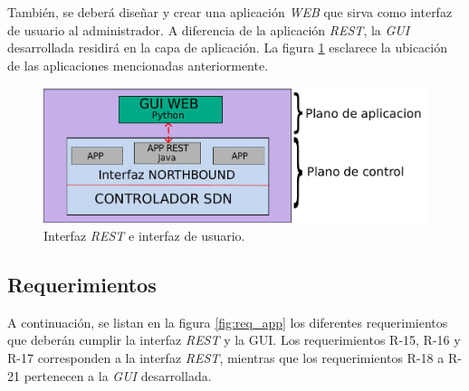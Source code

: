   También, se deberá diseñar y crear una aplicación \textit{WEB} que sirva como interfaz de usuario al administrador. A diferencia de la aplicación \textit{REST}, la \textit{GUI} desarrollada residirá en la capa de aplicación. La figura \ref{fig:ubicacionapp} esclarece la ubicación de las aplicaciones mencionadas anteriormente. 

  \begin{figure}[H]
    \centering
    \includegraphics[scale=0.60]{Figures/arq-rest-gui.pdf}
    \caption{Interfaz \textit{REST} e interfaz de usuario.}
    \label{fig:ubicacionapp}
  \end{figure}

  \subsection{Requerimientos}

  A continuación, se listan en la figura \ref{fig:req_app} los diferentes requerimientos que deberán cumplir la interfaz \textit{REST} y la GUI. Los requerimientos R-15, R-16 y R-17 corresponden a la interfaz \textit{REST}, mientras que los requerimientos R-18 a R-21 pertenecen a la \textit{GUI} desarrollada.  

